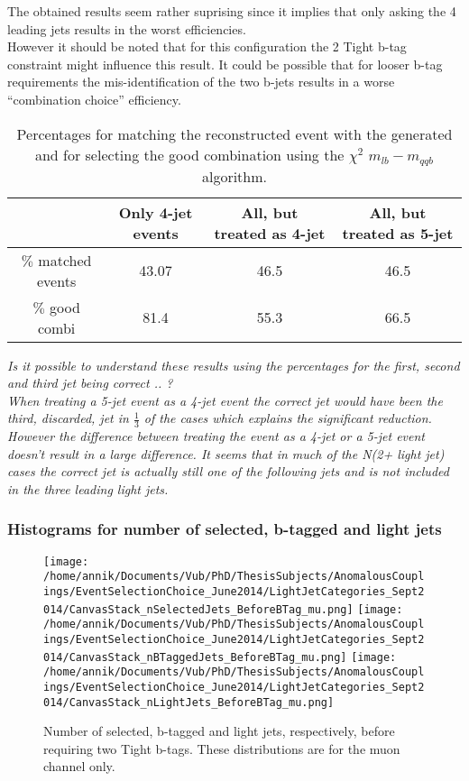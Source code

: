 The obtained results seem rather suprising since it implies that only asking the 4 leading jets results in the worst efficiencies. \\
However it should be noted that for this configuration the 2 Tight b-tag constraint might influence this result. It could be possible that for looser b-tag requirements the mis-identification of the two b-jets results in a worse ``combination choice'' efficiency.\\

\begin{table}[!h]
 \centering
 \begin{tabular}{c|c|c|c}
                         & Only 4-jet events & All, but treated as 4-jet & All, but treated as 5-jet  \\
  \hline
  $\%$ matched events    & 43.07                   & 46.5                               & 46.5  \\
  $\%$ good combi        & 81.4                    & 55.3                               & 66.5
 \end{tabular}
 \caption{Percentages for matching the reconstructed event with the generated and for selecting the good combination using the $\chi^{2}$ $m_{lb} - m_{qqb}$ algorithm. }\label{table::JetCategoryPercentages}
\end{table}

\textit{Is it possible to understand these results using the percentages for the first, second and third jet being correct .. ? \\ When treating a 5-jet event as a 4-jet event the correct jet would have been the third, discarded, jet in $\frac{1}{3}$ of the cases which explains the significant reduction. However the difference between treating the event as a 4-jet or a 5-jet event doesn't result in a large difference. It seems that in much of the N(2+ light jet) cases the correct jet is actually still one of the following jets and is not included in the three leading light jets.}

\subsubsection{Histograms for number of selected, b-tagged and light jets}\label{subsec::MSPlotsNBTaggedJets}
\begin{figure}[!h]
\texttt{[image: /home/annik/Documents/Vub/PhD/ThesisSubjects/AnomalousCouplings/EventSelectionChoice\_June2014/LightJetCategories\_Sept2014/CanvasStack\_nSelectedJets\_BeforeBTag\_mu.png]}
\texttt{[image: /home/annik/Documents/Vub/PhD/ThesisSubjects/AnomalousCouplings/EventSelectionChoice\_June2014/LightJetCategories\_Sept2014/CanvasStack\_nBTaggedJets\_BeforeBTag\_mu.png]}
\texttt{[image: /home/annik/Documents/Vub/PhD/ThesisSubjects/AnomalousCouplings/EventSelectionChoice\_June2014/LightJetCategories\_Sept2014/CanvasStack\_nLightJets\_BeforeBTag\_mu.png]}
\caption{Number of selected, b-tagged and light jets, respectively, before requiring two Tight b-tags. These distributions are for the muon channel only.}
\end{figure}

